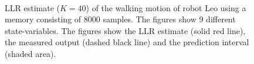 \begin{figure}[htbp]
{\label{fig:LLR-LeoFullMemStep_14}
} \\
\caption[\ac{LLR} estimate of Leo walking, state-variables 1-9]{\ac{LLR} estimate ($K=40$) of the walking motion of robot Leo using a memory consisting of 8000 samples. The figures show 9 different state-variables. The figures show the \ac{LLR} estimate (solid red line), the measured output (dashed black line) and the prediction interval (shaded area).}
\label{fig:LLR-LeoFullMemStep_all_a}
\end{figure}


